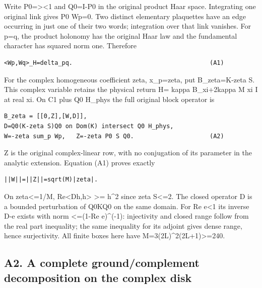 \documentclass[11pt,a4paper]{article}
\renewcommand{\[}{\begingroup\small\originaldisplaystart}
\renewcommand{\]}{\originaldisplayend\endgroup}
\begin{document}
Write P0=\textgreater\textless1\textbar{} and Q0=I-P0 in the
original product Haar space. Integrating one original link gives P0
Wp=0. Two distinct elementary plaquettes have an edge occurring in just
one of their two words; integration over that link vanishes. For p=q,
the product holonomy has the original Haar law and the fundamental
character has squared norm one. Therefore

\begin{verbatim}
<Wp,Wq>_H=delta_pq.                                      (A1)
\end{verbatim}

For the complex homogeneous coefficient zeta, x\_p=zeta, put
B\_zeta=K-zeta S. This complex variable retains the physical return H=
kappa B\_xi+2kappa M xi I at real xi. On C1 plus Q0 H\_phys the full
original block operator is

\begin{verbatim}
B_zeta = [[0,Z],[W,D]],
D=Q0(K-zeta S)Q0 on Dom(K) intersect Q0 H_phys,
W=-zeta sum_p Wp,   Z=-zeta P0 S Q0.                     (A2)
\end{verbatim}

Z is the original complex-linear row, with no conjugation of its
parameter in the analytic extension. Equation (A1) proves exactly

\begin{verbatim}
||W||=||Z||=sqrt(M)|zeta|.
\end{verbatim}

On \textbar zeta\textbar\textless=1/M, Re\textless Dh,h\textgreater{}
\textgreater= \textbar\textbar h\textbar\textbar\^{}2 since
\textbar\textbar zeta S\textbar\textbar\textless=2. The closed operator
D is a bounded perturbation of Q0KQ0 on the same domain. For Re
e\textless1 its inverse D-e exists with norm \textless=(1-Re e)\^{}(-1):
injectivity and closed range follow from the real part inequality; the
same inequality for its adjoint gives dense range, hence surjectivity.
All finite boxes here have
{M\allowbreak{}=\allowbreak{}3\allowbreak{}(\allowbreak{}2\allowbreak{}L\allowbreak{})\allowbreak{}\textasciicircum{}\allowbreak{}2\allowbreak{}(\allowbreak{}2\allowbreak{}L\allowbreak{}+\allowbreak{}1\allowbreak{})\allowbreak{}\textgreater{}\allowbreak{}=\allowbreak{}2\allowbreak{}4\allowbreak{}0\allowbreak{}.\allowbreak{}}

\subsection{A2. A complete ground/complement decomposition on the
complex
disk}\label{a2.-a-complete-groundcomplement-decomposition-on-the-complex-disk}
\end{document}
